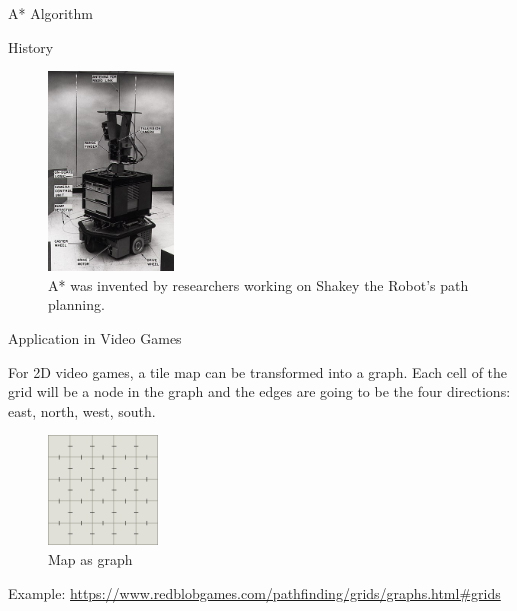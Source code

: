 \documentclass[ignorenonframetext,]{beamer}
\begin{document}
\begin{frame}{A* Algorithm}
\protect\hypertarget{a-algorithm-1}{}

\begin{block}{History}

\begin{figure}
\centering
\includegraphics[width=\textwidth,height=2.08333in]{330px-SRI_Shakey_with_callouts.jpg}
\caption{A* was invented by researchers working on Shakey the Robot's
path planning.}
\end{figure}

\end{block}

\end{frame}

\begin{frame}{Application in Video Games}
\protect\hypertarget{application-in-video-games}{}

For 2D video games, a tile map can be transformed into a graph. Each
cell of the grid will be a node in the graph and the edges are going to
be the four directions: east, north, west, south.

\begin{figure}
\centering
\includegraphics[width=\textwidth,height=1.14583in]{map-as-graph.png}
\caption{Map as graph}
\end{figure}

Example:
\url{https://www.redblobgames.com/pathfinding/grids/graphs.html\#grids}

\end{frame}
\end{document}
